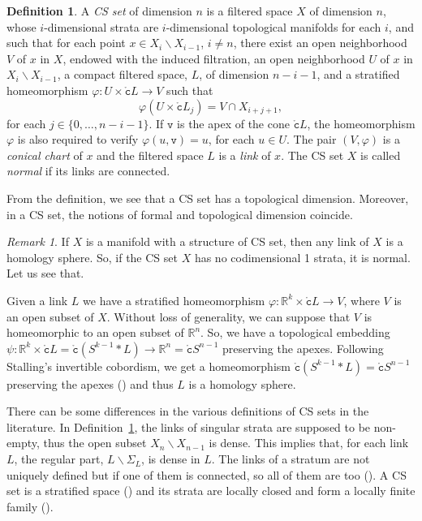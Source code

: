 \documentclass[a4paper,10pt,english,reqno]{amsart}
\theoremstyle{plain}
\theoremstyle{definition}
\newtheorem{definition}[proposition]{Definition}
\theoremstyle{remark}
\newtheorem{remark}[proposition]{Remark}
\numberwithin{equation}{section}
\newcommand{\defref}[1]{Definition~\ref{#1}}
\def\R{{\mathbb R}}
\def\tc{{\mathtt c}}
\def\tv{{\mathtt v}}
\def\R{\mathbb{R}}
\def\rc{{\mathring{\tc}}}
\def\menos{\backslash}
\renewcommand\1{\hbox{\ding{192}}}
\renewcommand\2{\hbox{\ding{193}}}
\newcommand\3{\hbox{\ding{194}}}
\newcommand\4{\hbox{\ding{195}}}
\begin{document}
\begin{definition}\label{def:csset}
A \emph{CS set} of dimension $n$ is a filtered space $X$ of dimension $n$,
whose $i$-dimensional strata are $i$-dimensional topological manifolds for each $i$, and
%
such that for each point $x \in X_i \backslash X_{i-1}$, $i\neq n$, there exist
 an open neighborhood $V$ of  $x$ in $X$, endowed with the induced filtration,
an open neighborhood $U$ of $x$ in $X_i\backslash X_{i-1}$, 
a compact filtered space, $L$, of dimension $n-i-1$,
and a stratified homeomorphism $\varphi \colon U \times \rc L\to V$ such that
%
\begin{equation}\label{equa:filteredlink}
\varphi(U\times \rc L_{j})=V\cap X_{i+j+1},
\end{equation}
%
 for each $j\in \{0,\dots,n-i-1\}$.
 If $\tv$ is the apex of the cone $\rc L$, the homeomorphism
 $\varphi$ is also required to verify $\varphi(u,\tv)=u$, for each $u\in U$.
The pair  $(V,\varphi)$ is a   \emph{conical chart} of $x$
 and the filtered space $L$ is a \emph{link} of $x$.
 The CS set $X$ is called  \emph{normal} if its links are connected.
\end{definition}

%
%
From the definition, we  see that a CS set has a topological dimension. Moreover, in a CS set, the notions of formal and topological dimension coincide.
%
%

\begin{remark}\label{rem:CSmanifold}
If $X$ is a manifold with a structure of CS set, then any link of $X$ is a homology sphere. 
So, if the CS set $X$ has no codimensional 1 strata, it is normal.
Let us see that. 

Given a link $L$ we have a stratified homeomorphism $\varphi \colon \R^k \times \rc L \to V$, 
where $V$ is an open subset of $X$. Without loss of generality, we can suppose that $V$ is homeomorphic to 
an open subset of $\R^n$. 
So, we have a topological embedding $\psi \colon  \R^k \times \rc L=\rc (S^{k-1}*L)  \to \R^n = \rc S^{n-1}$ 
preserving the apexes. Following Stalling's invertible cobordism, we get a homeomorphism $ \rc (S^{k-1}*L) = \rc S^{n-1}$
 preserving the apexes (\cite[Proposition 1]{MR800845}) and thus $L$ is a homology sphere.
%
\end{remark}

%
There can be some differences in the various definitions of CS sets in the literature. 
In \defref{def:csset}, the links of singular strata are supposed to be non-empty, 
 thus the open subset $ X_ {n} \backslash X_ {n-1} $ is dense.  
 This implies that, for each link $L$, the regular part, $L\menos \Sigma_{L}$, is dense in $L$.
 The links of a stratum are not uniquely defined but if  one of them is connected, so all of them are too
(\cite[Remark 2.6.2]{FriedmanBook}).
A CS set   is a stratified space (\cite[Appendix A2]{CST1}) and its strata are locally closed 
and form a locally finite family (\cite[Lemma 2.3.8]{FriedmanBook}).
\end{document}
